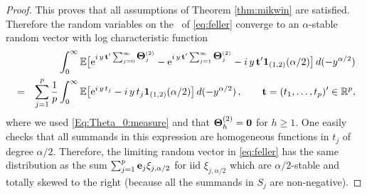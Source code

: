 \begin{proof}
This proves that all assumptions of Theorem \ref{thm:mikwin} are satisfied. 
Therefore the random variables on the \lhs\ of \eqref{eq:feller}
converge to an $\alpha$-stable random vector with log characteristic
function
\begin{eqnarray*}
&&\int_0^\infty {\mathbb E}\big[{\rm e}^{i\,y\,{\bf t}'\sum_{j=0}^\infty
  \mbox{\boldmath$\Theta$}_j^{(2)}}- {\rm e}^{i\,y\,{\bf t}'\sum_{j=1}^\infty
  \mbox{\boldmath$\Theta$}_j^{(2)}}-i\,y\,{\bf t}'\mathbf{1}_{(1,2)}(\alpha/2)\big]\,
d(-y^{\alpha/2})\\
&=&\sum_{j=1}^p \frac{1}{p}\int_0^\infty {\mathbb E}\big[{\rm e}^{i\,y\,t_j}-i\,y\,t_j\mathbf{1}_{(1,2)}(\alpha/2)\big]\,
d(-y^{\alpha/2})\,,\qquad {\bf t}=(t_1, \ldots, t_p)'\in{\mathbb R}^p,
\end{eqnarray*}
where we used \eqref{Eq:Theta_0:measure} and that $\mbox{\boldmath$\Theta$}_h^{(2)}=\bf0$
for $h\ge 1$. One easily checks that all summands in this expression
are homogeneous functions in $t_j$ of degree $\alpha/2$.  Therefore,
the limiting random vector in \eqref{eq:feller} has the same
distribution as the sum $\sum_{j=1}^p {\bf e}_j \xi_{j,\alpha/2}$ for iid
$\xi_{j,\alpha/2}$ which are $\alpha/2$-stable and totally skewed to
the right (because all the summands in $S_j$ are non-negative).
\end{proof}


